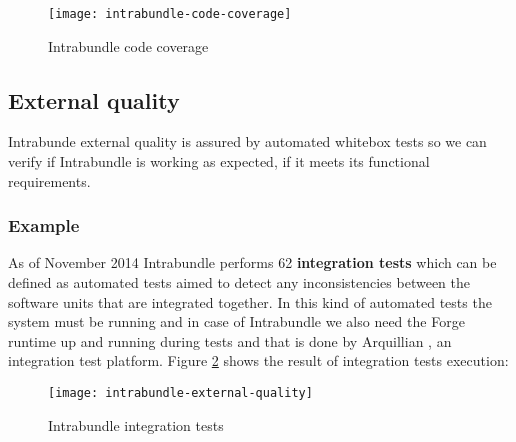 \begin{figure}[h]
\caption{Intrabundle code coverage}
\label{intrabundle-code-cover}
\texttt{[image: intrabundle-code-coverage]}
\end{figure}

\FloatBarrier

\subsection{External quality}
Intrabunde external quality is assured by automated whitebox tests so we can verify if Intrabundle is working as expected, if it meets its functional requirements.

\subsubsection{Example}
As of November 2014 Intrabundle performs 62 \textbf{integration tests} which can be defined as automated tests aimed to detect any inconsistencies between the software units that are integrated together. In this kind of automated tests the system must be running and in case of Intrabundle we also need the Forge runtime up and running during tests and that is done by Arquillian \citep{dan 2011}, an integration test platform. Figure \ref{intrabundle-integ-tests} shows the result of integration tests execution:

\begin{figure}[h]
\caption{Intrabundle integration tests}
\label{intrabundle-integ-tests}
\texttt{[image: intrabundle-external-quality]}
\centering
\end{figure}

\FloatBarrier
